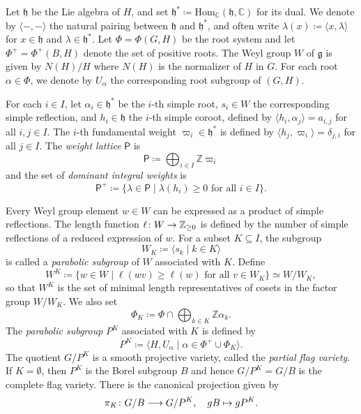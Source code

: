 \documentclass[11pt]{amsart}
\newcommand{\Z}{\mathbb{Z}}
\numberwithin{equation}{section}
\theoremstyle{plain}
\theoremstyle{definition}
\def\to{\mathchoice{\longrightarrow}{\rightarrow}{\rightarrow}{\rightarrow}}
\numberwithin{equation}{section}
\begin{document}
Let $\mathfrak{h}$ be the Lie algebra of $H$, and set $\mathfrak{h}^* \coloneqq \mathrm{Hom}_\mathbb{C}(\mathfrak{h}, \mathbb{C})$ for its dual. We denote by $\langle- , -  \rangle$ the natural pairing between $\mathfrak{h}$ and $\mathfrak{h}^*$, and often write $\lambda(x) \coloneqq \langle x, \lambda \rangle$ for $x \in \mathfrak{h}$ and $\lambda \in \mathfrak{h}^*$. Let $\Phi = \Phi(G,H)$ be the root system and let $\Phi^+ = \Phi^+(B,H)$ denote the set of positive roots. The Weyl group $W$ of $\mathfrak{g}$ is given by $N(H)/H$ where $N(H)$ is the normalizer of $H$ in $G$. For each root $\alpha \in \Phi$, we denote by $U_\alpha$ the corresponding root subgroup of $(G,H)$.

For each $i \in I$, let $\alpha_i \in \mathfrak{h}^*$ be the $i$-th simple root, $s_i \in W$ the corresponding simple reflection, and $h_i \in \mathfrak{h}$ the $i$-th simple coroot, defined by $\langle h_i, \alpha_j \rangle = a_{i,j}$ for all $i,j \in I$. The $i$-th fundamental weight $\varpi_i \in \mathfrak{h}^*$ is defined by $\langle h_j, \varpi_i \rangle = \delta_{j,i}$ for all $j \in I$. The \emph{weight lattice} $\mathsf{P}$ is
$$
\mathsf{P} \coloneqq \bigoplus_{i\in I} \Z \varpi_i
$$
and the set of \emph{dominant integral weights} is
$$
\mathsf{P}^+ \coloneqq \{ \lambda \in \mathsf{P} \mid \lambda (h_i) \ge 0 \text{ for all } i\in I \}.
$$

Every Weyl group element $w \in W$ can be expressed as a product of simple reflections. The length function $\ell \colon W \to \mathbb{Z}_{\ge 0}$ is defined by the number of simple reflections of a reduced expression of $w$. For a subset $K \subseteq I$, the subgroup
$$
W_K \coloneqq \langle s_k \mid k \in K \rangle
$$ 
is called a \emph{parabolic subgroup} of $W$ associated with $K$. Define
\begin{equation}\label{equ_W^K}
W^K \coloneqq \{ w \in W \mid \ell(wv) \geq \ell(w) \mbox{ for all $v \in W_K$} \} \simeq W/W_K,
\end{equation}
so that $W^K$ is the set of minimal length representatives of cosets in the factor group $W/W_K$. We also set 
$$
\Phi_K \coloneqq \Phi \cap \bigoplus_{k \in K} \mathbb{Z} \alpha_k.
$$ 
The  \emph{parabolic subgroup} $P^K$ associated with $K$ is defined by
$$
P^K \coloneqq \langle H, U_\alpha \mid \alpha \in \Phi^+ \cup \Phi_K \rangle.
$$
The quotient $G/P^K$ is a smooth projective variety, called the \emph{partial flag variety}. If $K = \emptyset$, then $P^K$ is the Borel subgroup $B$ and hence $G/P^K = G/B$ is the complete flag variety. There is the canonical projection given by
\begin{equation}
\pi_K \colon G/B \to G/P^K, \quad gB \mapsto gP^K.
\end{equation}
\end{document}
